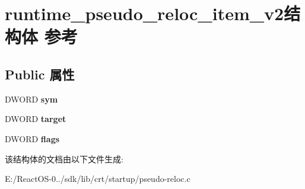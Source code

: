 \hypertarget{structruntime__pseudo__reloc__item__v2}{}\section{runtime\+\_\+pseudo\+\_\+reloc\+\_\+item\+\_\+v2结构体 参考}
\label{structruntime__pseudo__reloc__item__v2}
\subsection*{Public 属性}
\begin{DoxyCompactItemize}
\item 
\mbox{\label{structruntime__pseudo__reloc__item__v2_a05286a949cff20746fe0e32a9f99aaf0}} 
D\+W\+O\+RD {\bfseries sym}
\item 
\mbox{\label{structruntime__pseudo__reloc__item__v2_a9db563855240e1a4a697a9f9c5338b48}} 
D\+W\+O\+RD {\bfseries target}
\item 
\mbox{\label{structruntime__pseudo__reloc__item__v2_a07f6b5dfc923dbbeba9c4e6b92815cda}} 
D\+W\+O\+RD {\bfseries flags}
\end{DoxyCompactItemize}


该结构体的文档由以下文件生成\+:\begin{DoxyCompactItemize}
\item 
E\+:/\+React\+O\+S-\/0../sdk/lib/crt/startup/pseudo-\/reloc.\+c\end{DoxyCompactItemize}
